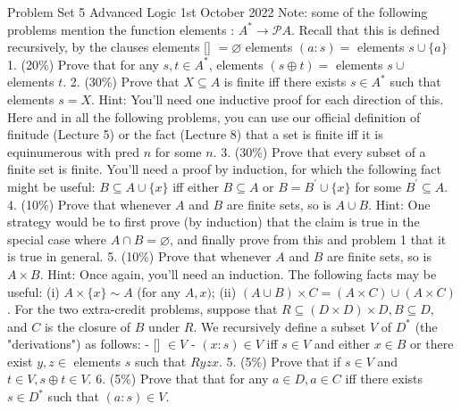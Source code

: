 Problem Set 5
Advanced Logic
1st October 2022
Note: some of the following problems mention the function elements : $A^* \rightarrow \mathcal{P} A$. Recall that this is defined recursively, by the clauses
elements [] $=\varnothing$
elements $(a: s)=$ elements $s \cup\{a\}$
1. (20\%) Prove that for any $s, t \in A^*$, elements $(s \oplus t)=$ elements $s \cup$ elements $t$.
2. (30\%) Prove that $X \subseteq A$ is finite iff there exists $s \in A^*$ such that elements $s=X$.
Hint: You'll need one inductive proof for each direction of this. Here and in all the following problems, you can use our official definition of finitude (Lecture 5) or the fact (Lecture 8) that a set is finite iff it is equinumerous with pred $n$ for some $n$.
3. (30\%) Prove that every subset of a finite set is finite.
You'll need a proof by induction, for which the following fact might be useful: $B \subseteq A \cup\{x\}$ iff either $B \subseteq A$ or $B=B^{\prime} \cup\{x\}$ for some $B^{\prime} \subseteq A$.
4. (10\%) Prove that whenever $A$ and $B$ are finite sets, so is $A \cup B$.
Hint: One strategy would be to first prove (by induction) that the claim is true in the special case where $A \cap B=\varnothing$, and finally prove from this and problem 1 that it is true in general.
5. (10\%) Prove that whenever $A$ and $B$ are finite sets, so is $A \times B$.
Hint: Once again, you'll need an induction. The following facts may be useful: (i) $A \times\{x\} \sim A$ (for any $A, x)$; (ii) $(A \cup B) \times C=(A \times C) \cup(A \times C)$.
For the two extra-credit problems, suppose that $R \subseteq(D \times D) \times D, B \subseteq D$, and $C$ is the closure of $B$ under $R$. We recursively define a subset $V$ of $D^*$ (the "derivations") as follows:
- [] $\in V$
- $(x: s) \in V$ iff $s \in V$ and either $x \in B$ or there exist $y, z \in$ elements $s$ such that $R y z x$.
5. (5\%) Prove that if $s \in V$ and $t \in V, s \oplus t \in V$.
6. (5\%) Prove that that for any $a \in D, a \in C$ iff there exists $s \in D^*$ such that $(a: s) \in V$.
